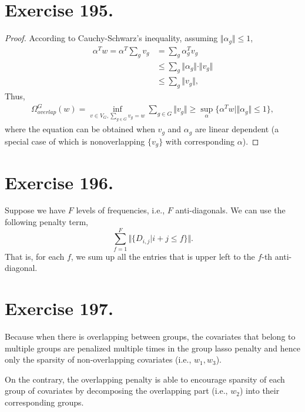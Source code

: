 \documentclass{article}
\begin{document}
\section{Exercise 195.}
\begin{proof}
According to Cauchy-Schwarz's inequality, assuming $\Vert \alpha_g \Vert \leq 1$,
\begin{align*}
    \alpha^{T} w  = \alpha^{T} \sum_g v_g &= \sum_g \alpha_g^{T} v_g \\
    & \leq \sum_g \Vert \alpha_g \Vert \cdot \Vert v_g \Vert \\
    & \leq \sum_g \Vert v_g \Vert,
\end{align*}
Thus, 
\begin{align*}
   \Omega_{overlap}^{G}(w) = \inf_{v\in V_{G}, \sum_{g\in G}v_g=w}\sum_{g\in G}\Vert v_g \Vert \geq \sup_{\alpha}\{\alpha^{T}w\vert\Vert \alpha_g \Vert \leq 1 \},
\end{align*}
where the equation can be obtained when $v_g$ and $\alpha_g$ are linear dependent (a special case of which is nonoverlapping $\{v_g\}$ with corresponding $\alpha$). 
\end{proof}

\section{Exercise 196.}
Suppose we have $F$ levels of frequencies, i.e., $F$ anti-diagonals. We can use the following penalty term,
$$
\sum_{f = 1}^{F}\Vert \{D_{i,j}\vert i + j \leq f\} \Vert.
$$
That is, for each $f$, we sum up all the entries that is upper left to the $f$-th anti-diagonal.

\section{Exercise 197.}
Because when there is overlapping between groups, the covariates that belong to multiple groups are penalized multiple times in the group lasso penalty and hence only the sparsity of non-overlapping covariates (i.e., $w_1,w_3$). 

On the contrary, the overlapping penalty is able to encourage sparsity of each group of covariates by decomposing the overlapping part (i.e., $w_2$) into their corresponding groups. 
\end{document}
